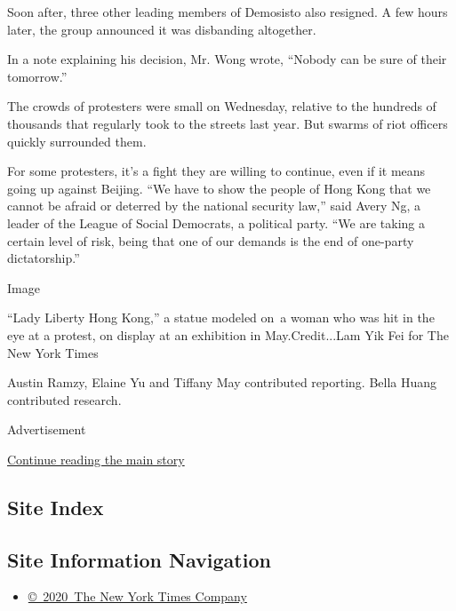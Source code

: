 Soon after, three other leading members of Demosisto also resigned. A
few hours later, the group announced it was disbanding altogether.

In a note explaining his decision, Mr. Wong wrote, ``Nobody can be sure
of their tomorrow.''

The crowds of protesters were small on Wednesday, relative to the
hundreds of thousands that regularly took to the streets last year. But
swarms of riot officers quickly surrounded them.

For some protesters, it's a fight they are willing to continue, even if
it means going up against Beijing. ``We have to show the people of Hong
Kong that we cannot be afraid or deterred by the national security
law,'' said Avery Ng, a leader of the League of Social Democrats, a
political party. ``We are taking a certain level of risk, being that one
of our demands is the end of one-party dictatorship.''

Image

``Lady Liberty Hong Kong,'' a statue modeled on~a woman who was hit in
the eye at a protest, on display at an exhibition in May.Credit...Lam
Yik Fei for The New York Times

Austin Ramzy, Elaine Yu and Tiffany May contributed reporting. Bella
Huang contributed research.

Advertisement

\protect\hyperlink{after-bottom}{Continue reading the main story}

\hypertarget{site-index}{%
\subsection{Site Index}\label{site-index}}

\hypertarget{site-information-navigation}{%
\subsection{Site Information
Navigation}\label{site-information-navigation}}

\begin{itemize}
\tightlist
\item
  \href{https://help.nytimes3xbfgragh.onion/hc/en-us/articles/115014792127-Copyright-notice}{©~2020~The
  New York Times Company}
\end{itemize}

